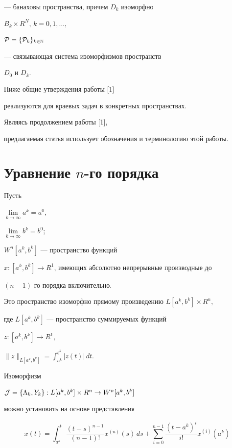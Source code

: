 --- банаховы пространства, причем $D_k$ изоморфно


$B_k\times R^N$, $k=0,1,\dotsc$,


${\cal P} = \{{\cal P}_k\}_{k\in {\Bbb N}}$


--- связывающая система изоморфизмов пространств


$D_0$ и $D_k$.





Ниже общие утверждения работы [1]


реализуются для краевых задач в конкретных пространствах.





Являясь продолжением работы [1],


предлагаемая статья использует обозначения и терминологию этой работы.





\section{Уравнение $n$-го порядка}





Пусть


$\lim\limits_{k\to\infty} a^k =a^0$,


$\lim\limits_{k\to\infty} b^k=b^0$;


$W^n[a^k,b^k]$ --- пространство функций


$x:[a^k,b^k]\to R^1$, имеющих абсолютно непрерывные производные до


$(n-1)$-го порядка включительно.


Это пространство изоморфно прямому произведению $L[a^k,b^k]\times R^n$,


где $L[a^k,b^k]$ --- пространство суммируемых функций


$z:[a^k,b^k]\to R^1$,


$\displaystyle \|z\|_{L[a^k,b^k]}=\int_{a^k}^{b^k} |z(t)|\,dt$.


Изоморфизм


${\cal J}=\{\Lambda_k,Y_k\}:L[a^k,b^k]\times R^n\to W^n[a^k,b^k]$


можно установить на основе представления


\begin{equation}


x(t) = \int_{a^k}^t\frac{(t-s)^{n-1}}{(n-1)!}x^{(n)}(s)\,ds+\sum_{i=0}^{n-1}


\frac{(t-a^k)^i}{i!} x^{(i)}(a^k)


\end{equation}



